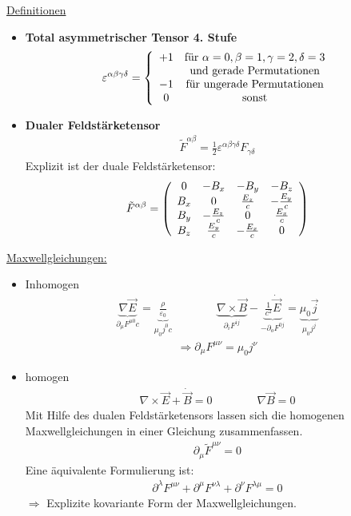 \underline{Definitionen}
\begin{itemize}
\item{\bf Total asymmetrischer Tensor 4. Stufe}
\begin{eqnarray*}
\varepsilon^{\alpha \beta\gamma\delta} = \left \{ \begin{array}{cc} +1 & \text{für }\alpha = 0, \beta = 1, \gamma= 2, \delta = 3\\&\text{und gerade Permutationen}\\ -1 &\text{für ungerade Permutationen}\\ 0 &\text{sonst} \end{array} \right.
\end{eqnarray*}
\item{\bf Dualer Feldstärketensor}
\begin{eqnarray*} \boxed{ \tilde{F}^{\alpha\beta} = \frac 1 2 \varepsilon^{\alpha\beta\gamma\delta} F_{\gamma\delta}}
\end{eqnarray*}
Explizit ist der duale Feldstärketensor:
\begin{eqnarray*} \tilde F^{\alpha\beta} = \left ( \begin{array}{cccc}
 0	&	-B_x	&	-B_y	&	 -B_z\\
B_x	&	0	&	\frac{E_z}c	&-\frac{E_y}c\\
B_y	&	-\frac{E_z}c	&	0	&\frac{E_x}c\\
B_z	&	\frac{E_y}c	&-\frac{E_x}c	&	0
\end{array}\right )
\end{eqnarray*}
\end{itemize}
\underline{Maxwellgleichungen:}
\begin{itemize}
\item{Inhomogen}
\begin{eqnarray*}
\underbrace{\nabla \vec E}_{\partial_{\mu}F^{\mu 0}c} = \underbrace{\frac{\rho}{\varepsilon_0}}_{\mu_0j^0c}\qquad \qquad \underbrace{\nabla \times \vec B}_{\partial_iF^{i j}} - \underbrace{\frac 1 {c^2}\dot{\vec E}}_{-\partial_oF^{0 j}} = \underbrace{\mu_0 \vec j}_{\mu_0 j^j}
\end{eqnarray*}
\begin{eqnarray*}\Rightarrow\boxed{\partial_{\mu}F^{\mu\nu} = \mu_0j^{\nu}}\end{eqnarray*}

\item{homogen}
\begin{eqnarray*} \nabla \times \vec E + \dot{\vec B} = 0 \qquad\qquad \nabla \vec B = 0\end{eqnarray*}
Mit Hilfe des dualen Feldstärketensors lassen sich die homogenen Maxwellgleichungen in einer Gleichung zusammenfassen.
\begin{eqnarray*} \boxed{ \partial_{\mu}\tilde F^{\mu\nu} = 0}\end{eqnarray*}
Eine äquivalente Formulierung ist:
\begin{eqnarray*} \partial^{\lambda} F^{\mu\nu} + \partial^{\mu}F^{\nu\lambda} + \partial^{\nu}F^{\lambda\mu} = 0\end{eqnarray*}
$\Longrightarrow$ Explizite kovariante Form der Maxwellgleichungen.

\end{itemize}
